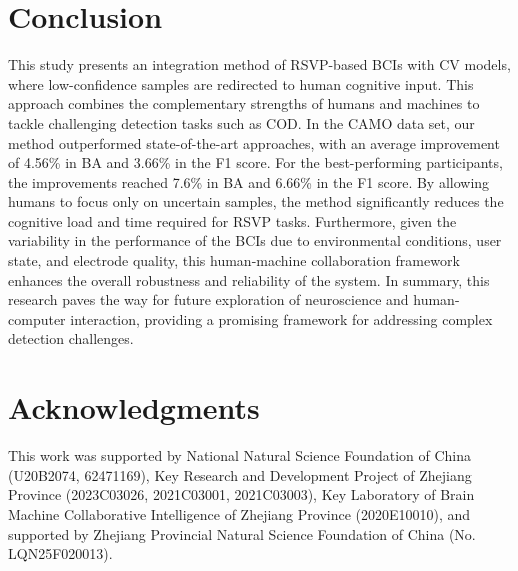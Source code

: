 \documentclass[preprint,12pt,authoryear]{elsarticle}
\begin{document}
\section{Conclusion}

This study presents an integration method of RSVP-based BCIs with CV models, where low-confidence samples are redirected to human cognitive input. This approach combines the complementary strengths of humans and machines to tackle challenging detection tasks such as COD. In the CAMO data set, our method outperformed state-of-the-art approaches, with an average improvement of 4.56\% in BA and 3.66\% in the F1 score. For the best-performing participants, the improvements reached 7.6\% in BA and 6.66\% in the F1 score. By allowing humans to focus only on uncertain samples, the method significantly reduces the cognitive load and time required for RSVP tasks. Furthermore, given the variability in the performance of the BCIs due to environmental conditions, user state, and electrode quality, this human-machine collaboration framework enhances the overall robustness and reliability of the system. In summary, this research paves the way for future exploration of neuroscience and human-computer interaction, providing a promising framework for addressing complex detection challenges.

\section{Acknowledgments}
This work was supported by National Natural Science Foundation of China (U20B2074, 62471169), Key Research and Development Project of Zhejiang Province (2023C03026, 2021C03001, 2021C03003), Key Laboratory of Brain Machine Collaborative Intelligence of Zhejiang Province (2020E10010), and supported by Zhejiang Provincial Natural Science Foundation of China (No. LQN25F020013).


%  
% 

\end{document}

